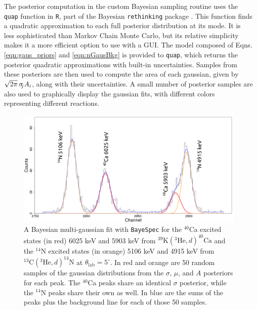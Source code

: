 The posterior computation in the custom Bayesian sampling routine uses the \texttt{quap} function in \texttt{R}, part of the Bayesian \texttt{rethinking} package \cite{Rethinking}. This function finds a quadratic approximation to each full posterior distribution at its mode. It is less sophisticated than Markov Chain Monte Carlo, but its relative simplicity makes it a more efficient option to use with a GUI. The model composed of Eqns. \ref{eqn:gaus_priors} and \ref{eqn:nGausBkg} is provided to \texttt{quap}, which returns the posterior quadratic approximations with built-in uncertainties. Samples from these posteriors are then used to compute the area of each gaussian, given by $\sqrt{2\pi} \, \sigma_{\hspace{-0.08cm} j} A_{i}$, along with their uncertainties. A small number of posterior samples are also used to graphically display the gaussian fits, with different colors representing different reactions.

\begin{figure}[t]
\centering
\includegraphics[width=6.5in]{Chapter-6/figs/Gaus_Bayesian.png}
\caption{\label{fig:Gaus_Bayesian}A Bayesian multi-gaussian fit with \texttt{BayeSpec} for the $^{40}$Ca excited states (in red) 6025 keV and 5903 keV from $^{39}\mathrm{K}(^{3}\mathrm{He},d)^{40}\mathrm{Ca}$ and the $^{14}$N excited states (in orange) 5106 keV and 4915 keV from $^{13}\mathrm{C}(^{3}\mathrm{He},d)^{14}\mathrm{N}$ at $\theta_{\mathrm{lab}} = 5^{\circ}$. In red and orange are 50 random samples of the gaussian distributions from the $\sigma$, $\mu$, and $A$ posteriors for each peak. The $^{40}$Ca peaks share an identical $\sigma$ posterior, while the $^{14}$N peaks share their own as well. In blue are the sums of the peaks plus the background line for each of those 50 samples.}
\end{figure}


